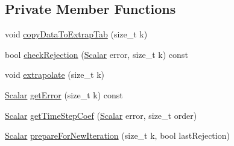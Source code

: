\subsection*{Private Member Functions}
\begin{DoxyCompactItemize}
\item 
void \mbox{\hyperlink{class_b_s_iterator_a95c268219a8321af35a628db4e22bec4}{copy\+Data\+To\+Extrap\+Tab}} (size\+\_\+t k)
\item 
bool \mbox{\hyperlink{class_b_s_iterator_a42976d786ffe422a86cc5a7b0a077609}{check\+Rejection}} (\mbox{\hyperlink{class_b_s_iterator_a7857f8ff9032955ea4dcc22cd18ca7a1}{Scalar}} error, size\+\_\+t k) const
\item 
void \mbox{\hyperlink{class_b_s_iterator_ac1edf158e3dd05ed15afd5d0f31c121a}{extrapolate}} (size\+\_\+t k)
\item 
\mbox{\hyperlink{class_b_s_iterator_a7857f8ff9032955ea4dcc22cd18ca7a1}{Scalar}} \mbox{\hyperlink{class_b_s_iterator_a9f50e084f8650e4d7fea3535a0547139}{get\+Error}} (size\+\_\+t k) const
\item 
\mbox{\hyperlink{class_b_s_iterator_a7857f8ff9032955ea4dcc22cd18ca7a1}{Scalar}} \mbox{\hyperlink{class_b_s_iterator_a9d06a0d0c9e458ea96952b0514adece9}{get\+Time\+Step\+Coef}} (\mbox{\hyperlink{class_b_s_iterator_a7857f8ff9032955ea4dcc22cd18ca7a1}{Scalar}} error, size\+\_\+t order)
\item 
\mbox{\hyperlink{class_b_s_iterator_a7857f8ff9032955ea4dcc22cd18ca7a1}{Scalar}} \mbox{\hyperlink{class_b_s_iterator_a738a558ddfacd9959c9438862001d7e8}{prepare\+For\+New\+Iteration}} (size\+\_\+t k, bool last\+Rejection)
\end{DoxyCompactItemize}
